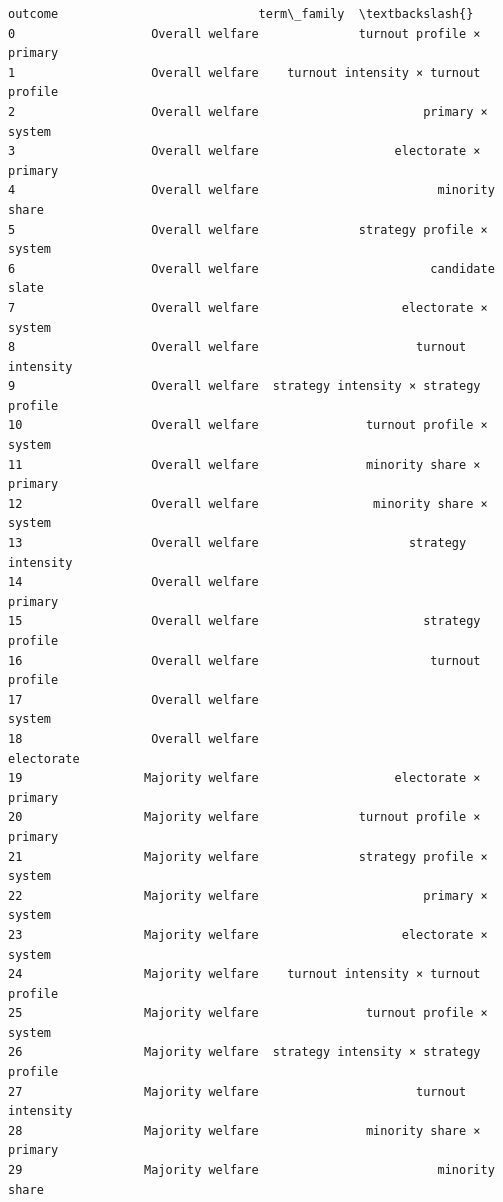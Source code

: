 \documentclass[11pt]{article}
\makeatletter
\newcommand{\boxspacing}{\kern\kvtcb@left@rule\kern\kvtcb@boxsep}
\newcommand{\prompt}[4]{
        {\ttfamily\llap{{\color{#2}[#3]:\hspace{3pt}#4}}\vspace{-\baselineskip}}
    }
\makeatother
\begin{document}
    
            \begin{tcolorbox}[breakable, size=fbox, boxrule=.5pt, pad at break*=1mm, opacityfill=0]
\prompt{Out}{outcolor}{37}{\boxspacing}
\begin{Verbatim}[commandchars=\\\{\}]
                            outcome                            term\_family  \textbackslash{}
0                   Overall welfare              turnout profile × primary
1                   Overall welfare    turnout intensity × turnout profile
2                   Overall welfare                       primary × system
3                   Overall welfare                   electorate × primary
4                   Overall welfare                         minority share
5                   Overall welfare              strategy profile × system
6                   Overall welfare                        candidate slate
7                   Overall welfare                    electorate × system
8                   Overall welfare                      turnout intensity
9                   Overall welfare  strategy intensity × strategy profile
10                  Overall welfare               turnout profile × system
11                  Overall welfare               minority share × primary
12                  Overall welfare                minority share × system
13                  Overall welfare                     strategy intensity
14                  Overall welfare                                primary
15                  Overall welfare                       strategy profile
16                  Overall welfare                        turnout profile
17                  Overall welfare                                 system
18                  Overall welfare                             electorate
19                 Majority welfare                   electorate × primary
20                 Majority welfare              turnout profile × primary
21                 Majority welfare              strategy profile × system
22                 Majority welfare                       primary × system
23                 Majority welfare                    electorate × system
24                 Majority welfare    turnout intensity × turnout profile
25                 Majority welfare               turnout profile × system
26                 Majority welfare  strategy intensity × strategy profile
27                 Majority welfare                      turnout intensity
28                 Majority welfare               minority share × primary
29                 Majority welfare                         minority share

\end{Verbatim}
\end{tcolorbox}
\end{document}
